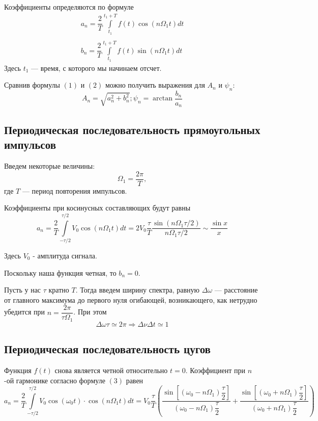 \documentclass[11pt]{article}
\begin{document}
Коэффициенты определяются по формуле
\begin{equation}
\begin{array}{c}
a_n  = \dfrac{2}{T}\int\limits_{t_1}^{t_1+T}f(t)\cos\left(n \Omega_1 t\right) dt\\
\\
b_n = \dfrac{2}{T}\int\limits_{t_1}^{t_1+T}f(t)\sin\left(n \Omega_1 t\right) dt
\end{array}
\end{equation}
Здесь $t_1$ --- время, с которого мы начинаем отсчет.

Сравнив формулы $(1)$ и $(2)$ можно получить выражения для $A_n$  и $\psi_n$:
\begin{equation}
A_n = \sqrt{a_n^2+b_n^2};\psi_n = \arctan \dfrac{b_n}{a_n}
\end{equation}
\subsection*{Периодическая последовательность прямоугольных импульсов}
Введем некоторые величины:
\[\Omega_1 = \dfrac{2\pi}{T}, \]
где $T$ --- период повторения импульсов.

Коэффициенты при косинусных составляющих будут равны
\begin{equation}
a_n = \dfrac{2}{T}\int\limits_{-\tau/2}^{\tau/2}V_0\cos\left(n\Omega_1 t\right)dt = 2V_0\dfrac{\tau}{T}\dfrac{\sin\left(n\Omega_1\tau/2\right)}{n\Omega_1\tau/2} \sim \dfrac{\sin x}{x}
\end{equation}

Здесь $V_0$ - амплитуда сигнала.

Поскольку наша функция четная, то $b_n = 0$. 

Пусть у нас $\tau$ кратно $T$. Тогда введем ширину спектра, равную $\Delta \omega$ --- расстояние от главного максимума до первого нуля огибающей, возникающего, как нетрудно убедится при $n = \dfrac{2\pi}{\tau \Omega_1}$. При 
этом
\begin{equation}
\Delta \omega \tau \simeq 2\pi \Rightarrow \Delta \nu \Delta t \simeq 1
\end{equation}
\subsection*{Периодическая последовательность цугов}
Функция $f(t)$ снова является четной относительно $t = 0$. Коэффициент при $n$-ой гармонике согласно формуле $(3)$ равен
\begin{equation}
a_n = \dfrac{2}{T}\int\limits_{-\tau/2}^{\tau/2}V_0 \cos \left(\omega_0t\right) \cdot \cos\left(n \Omega_1t\right)dt = V_0 \dfrac{\tau}{T}\left( \dfrac{\sin\left[\left(\omega_0 - n \Omega_1\right)\dfrac{\tau}{2}\right]}{\left( \omega_0 - n \Omega_1\right) \dfrac{\tau}{2}} + \dfrac{\sin\left[\left(\omega_0 + n \Omega_1\right)\dfrac{\tau}{2}\right]}{\left( \omega_0 + n \Omega_1\right) \dfrac{\tau}{2}}\right)
\end{equation}
\end{document}
